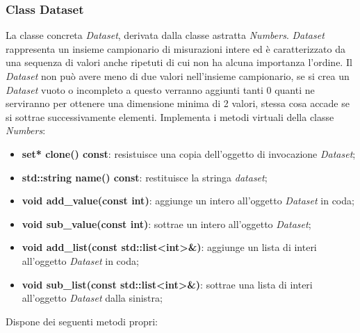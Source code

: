 \documentclass[a4paper,10pt]{article}
\begin{document}
    \subsubsection{Class Dataset}
    La classe concreta \textit{Dataset}, derivata dalla classe astratta \textit{Numbers}. \textit{Dataset} rappresenta un insieme campionario di misurazioni intere ed è caratterizzato da una sequenza di valori anche ripetuti di cui non ha alcuna importanza l’ordine. Il \textit{Dataset} non può avere meno di due valori nell’insieme campionario, se si crea un \textit{Dataset} vuoto o incompleto a questo verranno aggiunti tanti 0 quanti ne serviranno per ottenere una dimensione minima di 2 valori, stessa cosa accade se si sottrae successivamente elementi.
    Implementa i metodi virtuali della classe \textit{Numbers}:
	\begin{itemize}
        \item \textbf{set* clone() const}: resistuisce una copia dell'oggetto di invocazione \textit{Dataset};
		\item \textbf{std::string name() const}: restituisce la stringa \textit{dataset};
        \item \textbf{void add\_value(const int)}: aggiunge un intero all'oggetto \textit{Dataset} in coda;
		\item \textbf{void sub\_value(const int)}: sottrae un intero all'oggetto \textit{Dataset};
		\item \textbf{void add\_list(const std::list<int>\&)}: aggiunge un lista di interi all'oggetto \textit{Dataset} in coda;
        \item \textbf{void sub\_list(const std::list<int>\&)}: sottrae una lista di interi all'oggetto \textit{Dataset} dalla sinistra;
    \end{itemize}
    Dispone dei seguenti metodi propri:
\end{document}
